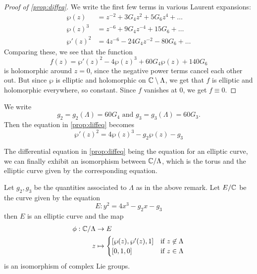 \begin{proof}[Proof of \ref{prop:diffeq}]
	We write the first few terms in various Laurent expansions:
	\begin{align*}
		\wp(z) &= z^{-2} + 3G_4z^2 + 5G_6z^4 + \dots\\
		\wp(z)^3 &= z^{-6} + 9G_4z^{-4} + 15G_6 + \dots\\
		\wp'(z)^2 &= 4z^{-6} - 24G_4z^{-2} - 80G_6 + \dots
	\end{align*}
	Comparing these, we see that the function
	\begin{equation*}
		f(z) = \wp'(z)^2 - 4\wp(z)^3 + 60G_4\wp(z) + 140G_6
	\end{equation*}
	is holomorphic around $z = 0$, since the negative power terms cancel
	each other out. But since $\wp$ is elliptic and holomorphic on $\mathbb{C} \setminus
	\Lambda$, we get that $f$ is elliptic and holomorphic everywhere,
	so constant.
	Since $f$ vanishes at $0$, we get $f\equiv 0$.
\end{proof}

\begin{remark}
	We write
	\begin{equation*}
		g_2 = g_2(\Lambda) = 60G_4
		\textrm{ and }
		g_3 = g_3(\Lambda) = 60G_3.
	\end{equation*}
	Then the equation in \ref{prop:diffeq} becomes
	\begin{equation*}
		\wp'(z)^2 = 4\wp(z)^3 - g_2\wp(z) - g_3
	\end{equation*}
\end{remark}

The differential equation in \ref{prop:diffeq} being the equation for
an elliptic curve, we can finally exhibit an isomorphism between
$\mathbb{C}/\Lambda$, which is the torus and the elliptic curve given by the
corresponding equation.

\begin{theorem}
	\label{thm:lattice-curve}
	Let $g_2, g_3$ be the quantities associated to $\Lambda$ as in the above
	remark.
	Let $E/\mathbb{C}$ be the curve given by the equation
	\begin{equation*}
		E: y^2 = 4x^3 - g_2 x - g_3
	\end{equation*}
	then $E$ is an elliptic curve and the map
	\begin{align*}
		\phi: \mathbb{C}/\Lambda &\to E\\
		z &\mapsto 
		\begin{cases}
			[\wp(z), \wp'(z), 1] &\textrm{if } z \not\in \Lambda\\
			[0, 1, 0] &\textrm{if } z \in \Lambda
		\end{cases}
	\end{align*}
	is an isomorphism of complex Lie groups.
\end{theorem}

